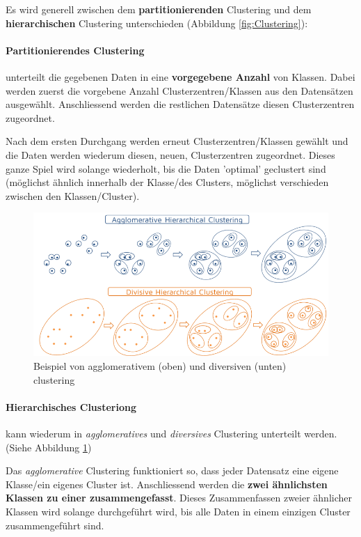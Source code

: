 \documentclass[a4paper, 11pt, nofootinbib]{article}
\begin{document}
 \noindent Es wird generell zwischen dem \textbf{partitionierenden} Clustering und dem \textbf{hierarchischen} Clustering unterschieden (Abbildung \ref{fig:Clustering}):
 
 \paragraph{Partitionierendes Clustering} unterteilt die gegebenen Daten in eine \textbf{vorgegebene Anzahl} von Klassen. Dabei werden zuerst die vorgebene Anzahl Clusterzentren/Klassen aus den Datensätzen ausgewählt. Anschliessend werden die restlichen Datensätze diesen Clusterzentren zugeordnet. 
 
 Nach dem ersten Durchgang werden erneut Clusterzentren/Klassen gewählt und die Daten werden wiederum diesen, neuen, Clusterzentren zugeordnet. Dieses ganze Spiel wird solange wiederholt, bis die Daten 'optimal' geclustert sind (möglichst ähnlich innerhalb der Klasse/des Clusters, möglichst verschieden zwischen den Klassen/Cluster).
 
   \begin{figure}[htb]
 	\centering
 	\includegraphics[keepaspectratio=true,height=12\baselineskip]{hierarchical_clustering.png}
 	\caption{Beispiel von agglomerativem (oben) und diversiven (unten) clustering}
 	\label{fig:hierCluster}
 \end{figure}
 
 \paragraph{Hierarchisches Clusteriong} kann wiederum in \textit{agglomeratives} und \textit{diversives} Clustering unterteilt werden. (Siehe Abbildung \ref{fig:hierCluster})
 
 Das \textit{agglomerative} Clustering funktioniert so, dass jeder Datensatz eine eigene Klasse/ein eigenes Cluster ist. Anschliessend werden die \textbf{zwei ähnlichsten Klassen zu einer zusammengefasst}. Dieses Zusammenfassen zweier ähnlicher Klassen wird solange durchgeführt wird, bis alle Daten in einem einzigen Cluster zusammengeführt sind.
 
\end{document}
